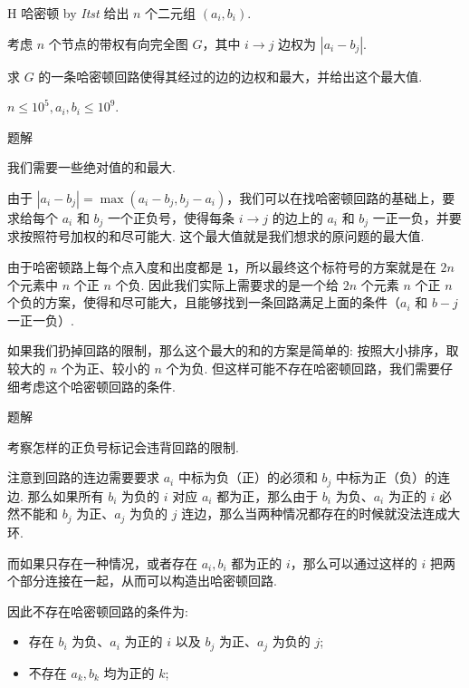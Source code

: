 \begin{frame}{H 哈密顿 {by \itshape Itst}}
	给出 $n$ 个二元组 $(a_i,b_i)$.

	考虑 $n$ 个节点的带权有向完全图 $G$，其中 $i\rightarrow j$ 边权为 $|a_i-b_j|$.

	求 $G$ 的一条哈密顿回路使得其经过的边的边权和最大，并给出这个最大值.

	$n\le 10^5, a_i,b_i\le 10^9$.

\end{frame}

\begin{frame}{题解}
	
	我们需要一些绝对值的和最大. \pause

	由于 $|a_i-b_j|=\max(a_i-b_j,b_j-a_i)$，我们可以在找哈密顿回路的基础上，要求给每个 $a_i$ 和 $b_j$ 一个正负号，使得每条 $i\rightarrow j$ 的边上的 $a_i$ 和 $b_j$ 一正一负，并要求按照符号加权的和尽可能大. 这个最大值就是我们想求的原问题的最大值. \pause

	由于哈密顿路上每个点入度和出度都是 \texttt{1}，所以最终这个标符号的方案就是在 $2n$ 个元素中 $n$ 个正 $n$ 个负. 因此我们实际上需要求的是一个给 $2n$ 个元素 $n$ 个正 $n$ 个负的方案，使得和尽可能大，且能够找到一条回路满足上面的条件（$a_i$ 和 $b-j$ 一正一负）. \pause

	如果我们扔掉回路的限制，那么这个最大的和的方案是简单的: 按照大小排序，取较大的 $n$ 个为正、较小的 $n$ 个为负. 但这样可能不存在哈密顿回路，我们需要仔细考虑这个哈密顿回路的条件.

\end{frame}

\begin{frame}{题解}

	考察怎样的正负号标记会违背回路的限制. \pause

	注意到回路的连边需要要求 $a_i$ 中标为负（正）的必须和 $b_j$ 中标为正（负）的连边. 那么如果所有 $b_i$ 为负的 $i$ 对应 $a_i$ 都为正，那么由于 $b_i$ 为负、$a_i$ 为正的 $i$ 必然不能和 $b_j$ 为正、$a_j$ 为负的 $j$ 连边，那么当两种情况都存在的时候就没法连成大环. \pause

	而如果只存在一种情况，或者存在 $a_i,b_i$ 都为正的 $i$，那么可以通过这样的 $i$ 把两个部分连接在一起，从而可以构造出哈密顿回路. \pause

	因此不存在哈密顿回路的条件为: \pause
	\begin{itemize}
	\item 存在 $b_i$ 为负、$a_i$ 为正的 $i$ 以及 $b_j$ 为正、$a_j$ 为负的 $j$; \pause
	\item 不存在 $a_k,b_k$ 均为正的 $k$;
	\end{itemize}

\end{frame}

